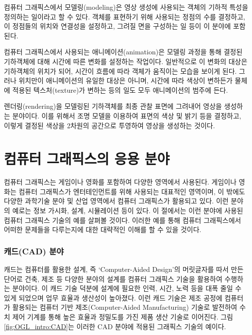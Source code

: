컴퓨터 그래픽스에서 모델링(modeling)은 영상 생성에 사용되는 객체의 기하적 특성을 정의하는 일이라고 할 수 있다. 객체를 표현하기 위해 사용되는 정점의 수를 결정하고, 이 정점들의 위치와 연결성을 설정하고, 그려질 면을 구성하는 일 등이 이 분야에 포함된다.

컴퓨터 그래픽스에서 사용되는 애니메이션(animation)은 모델링 과정을 통해 결정된 기하객체에 대해 시간에 따른 변화를 설정하는 작업이다. 일반적으로 이 변화의 대상은 기하객체의 위치가 되어, 시간이 흐름에 따라 객체가 움직이는 모습을 보이게 된다. 그러나 위치만이 애니메이션의 유일한 대상은 아니며, 시간에 따라 색상이 변하든가 물체에 적용된 텍스처(texture)가 변하는 등의 일도 모두 애니메이션의 범주에 든다.

렌더링(rendering)을 모델링된 기하객체를 최종 관찰 표면에 그려내어 영상을 생성하는 분야이다. 이를 위해서 조명 모델을 이용하여 표면의 색상 및 밝기 등을 결정하고, 이렇게 결정된 색상을 2차원의 공간으로 투영하여 영상을 생성하는 것이다.


\section{컴퓨터 그래픽스의 응용 분야}

컴퓨터 그래픽스는 게임이나 영화를 포함하여 다양한 영역에서 사용된다. 게임이나 영화는 컴퓨터 그래픽스가 엔터테인먼트를 위해 사용되는 대표적인 영역이며, 이 밖에도 다양한 과학기술 분야 및 산업 영역에서 컴퓨터 그래픽스가 활용되고 있다. 이런 분야의 예로는 정보 가시화, 설계, 시뮬레이션 등이 있다. 이 절에서는 이런 분야에 사용된 컴퓨터 그래픽스 기술의 예를 살펴볼 것이다. 이러한 예를 통해 컴퓨터 그래픽스에서 어떠한 문제들을 다루는지에 대한 대략적인 이해를 할 수 있을 것이다.



\subsubsection{캐드(CAD) 분야}

캐드는 컴퓨터를 활용한 설계, 즉 ‘Computer-Aided Design’의 머릿글자를 따서 만든 단어로 건축, 제조 등 다양한 분야의 설계를 컴퓨터 그래픽스 기술을 활용하여 수행하는 분야이다. 이 캐드 기술 덕분에 설계에 필요한 인력, 시간, 노력 등을 대폭 줄일 수 있게 되었으며 업무 효율과 생산성이 높아졌다. 이런 캐드 기술은 제조 공정에 컴퓨터가 활용되는 컴퓨터 기반 제조(Computer-Aided Manufacturing) 기술로 발전하여 수치 제어 기계를 통해 높은 효율과 정밀도를 가진 제품 생산 기술로 이어진다. 그림 \ref{fig:OGL_intro:CAD}는 이러한 CAD 분야에 적용된 그래픽스 기술의 예이다.

